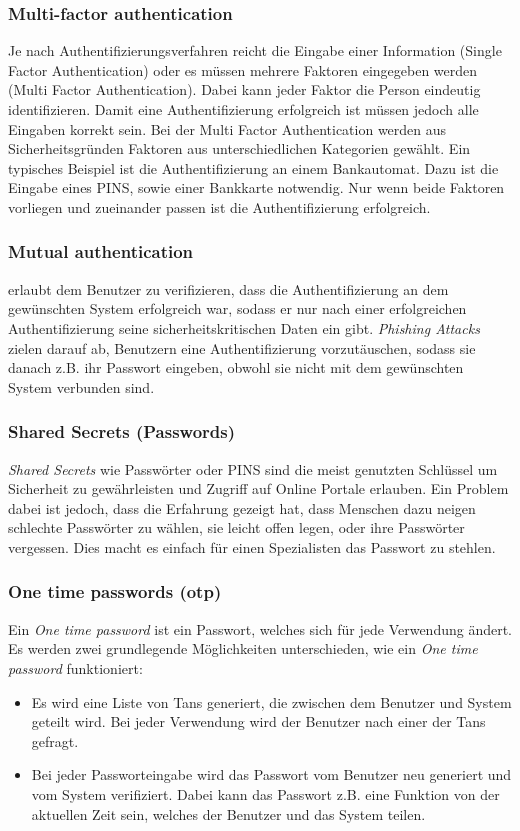 \subsubsection{Multi-factor authentication}
Je nach Authentifizierungsverfahren reicht die Eingabe einer Information (Single Factor Authentication) oder es müssen mehrere Faktoren eingegeben werden (Multi Factor Authentication).
Dabei kann jeder Faktor die Person eindeutig identifizieren. Damit eine Authentifizierung erfolgreich ist müssen jedoch alle Eingaben korrekt sein. Bei der Multi Factor Authentication werden aus Sicherheitsgründen Faktoren aus unterschiedlichen Kategorien gewählt. Ein typisches Beispiel ist die Authentifizierung an einem Bankautomat. Dazu ist die Eingabe eines PINS, sowie einer Bankkarte notwendig. Nur wenn beide Faktoren vorliegen und zueinander passen ist die Authentifizierung erfolgreich. 
\subsubsection{Mutual authentication}
erlaubt dem Benutzer zu verifizieren, dass die Authentifizierung an dem gewünschten System erfolgreich war, sodass er nur nach einer erfolgreichen Authentifizierung seine sicherheitskritischen Daten ein gibt. \textit{Phishing Attacks} zielen darauf ab, Benutzern eine Authentifizierung  vorzutäuschen, sodass sie danach z.B. ihr Passwort eingeben, obwohl sie nicht mit dem gewünschten System verbunden sind.


\subsubsection{Shared Secrets (Passwords)}
\textit{Shared Secrets} wie Passwörter oder PINS sind die meist genutzten Schlüssel um Sicherheit zu gewährleisten und Zugriff auf Online Portale erlauben. Ein Problem dabei ist jedoch, dass die Erfahrung gezeigt hat, dass Menschen dazu neigen schlechte Passwörter zu wählen, sie leicht offen legen, oder ihre Passwörter vergessen. Dies macht es einfach für einen Spezialisten das Passwort zu stehlen. 
\subsubsection{One time passwords (otp)}
Ein \textit{One time password} ist ein Passwort, welches sich für jede Verwendung ändert. Es werden zwei grundlegende Möglichkeiten unterschieden, wie ein \textit{One time password} funktioniert:
\begin{itemize}
\item Es wird eine Liste von Tans generiert, die zwischen dem Benutzer und System geteilt wird. Bei jeder Verwendung wird der Benutzer nach einer der Tans gefragt.
\item Bei jeder Passworteingabe wird das Passwort vom Benutzer neu generiert und vom System verifiziert. Dabei kann das Passwort z.B. eine Funktion von der aktuellen Zeit sein, welches der Benutzer und das System teilen.
\end{itemize}
